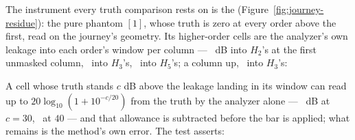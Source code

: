 \documentclass[11pt,a4paper]{article}
\begin{document}
The instrument every truth comparison rests on is the 
(Figure~\ref{fig:journey-residue}): the pure phantom $[1]$, whose truth is
zero at every order above the first, read on the journey's geometry. Its
higher-order cells are the analyzer's own leakage into each order's window
per column --- \jparityLeakageHTwoColumnOne\ dB into $H_2$'s at the first
unmasked column, \jparityLeakageHThreeColumnOne\ into $H_3$'s,
\jparityLeakageHFiveColumnOne\ into $H_5$'s; a column up,
\jparityLeakageHThreeColumnTwo\ into $H_3$'s:
\begin{center}\small\jparityLeakageTable\end{center}
A cell whose truth stands $c$ dB above the leakage landing in its window
can read up to $20\log_{10}(1 + 10^{-c/20})$ from the truth by the
analyzer alone --- \jparityBoundThirty\ dB at $c = 30$, \jparityBoundForty\
at $40$ --- and that allowance is subtracted before the bar is applied;
what remains is the method's own error. \machineFloorNote{} The test
asserts:
\end{document}
